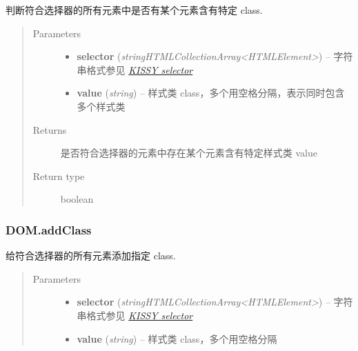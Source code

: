 \documentclass[letterpaper,10pt,english]{sphinxmanual}
\begin{document}
\begin{fulllineitems}
\label{api/core/dom/hasClass:DOM.hasClass}
判断符合选择器的所有元素中是否有某个元素含有特定 class.
\begin{quote}\begin{description}
\item[{Parameters}] \leavevmode\begin{itemize}
\item {}
\textbf{selector} (\emph{string\textbar{}HTMLCollection\textbar{}Array\textless{}HTMLElement\textgreater{}}) -- 字符串格式参见 {\hyperref[api/core/dom/selector:dom-selector]{\emph{KISSY selector}}}

\item {}
\textbf{value} (\emph{string}) -- 样式类 class，多个用空格分隔，表示同时包含多个样式类

\end{itemize}

\item[{Returns}] \leavevmode
是否符合选择器的元素中存在某个元素含有特定样式类 value

\item[{Return type}] \leavevmode
boolean

\end{description}\end{quote}

\end{fulllineitems}



\subsubsection{DOM.addClass}
\label{api/core/dom/addClass::doc}\label{api/core/dom/addClass:dom-addclass}

\begin{fulllineitems}
\label{api/core/dom/addClass:DOM.addClass}
给符合选择器的所有元素添加指定 class.
\begin{quote}\begin{description}
\item[{Parameters}] \leavevmode\begin{itemize}
\item {}
\textbf{selector} (\emph{string\textbar{}HTMLCollection\textbar{}Array\textless{}HTMLElement\textgreater{}}) -- 字符串格式参见 {\hyperref[api/core/dom/selector:dom-selector]{\emph{KISSY selector}}}

\item {}
\textbf{value} (\emph{string}) -- 样式类 class，多个用空格分隔

\end{itemize}

\end{description}\end{quote}

\end{fulllineitems}
\end{document}
